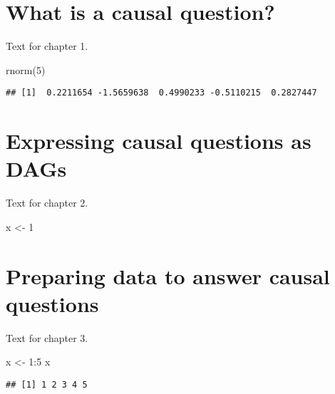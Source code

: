 \documentclass[
]{article}
\newenvironment{Shaded}{\begin{snugshade}}{\end{snugshade}}
\newcommand{\DecValTok}[1]{\textcolor[rgb]{0.00,0.00,0.81}{#1}}
\newcommand{\FunctionTok}[1]{\textcolor[rgb]{0.00,0.00,0.00}{#1}}
\newcommand{\NormalTok}[1]{#1}
\newcommand{\OtherTok}[1]{\textcolor[rgb]{0.56,0.35,0.01}{#1}}
\newcommand{\SpecialCharTok}[1]{\textcolor[rgb]{0.00,0.00,0.00}{#1}}
\begin{document}
\hypertarget{what-is-a-causal-question}{%
\section{What is a causal question?}\label{what-is-a-causal-question}}

Text for chapter 1.

\begin{Shaded}
\begin{Highlighting}[]
\FunctionTok{rnorm}\NormalTok{(}\DecValTok{5}\NormalTok{)}
\end{Highlighting}
\end{Shaded}

\begin{verbatim}
## [1]  0.2211654 -1.5659638  0.4990233 -0.5110215  0.2827447
\end{verbatim}

\hypertarget{expressing-causal-questions-as-dags}{%
\section{Expressing causal questions as DAGs}\label{expressing-causal-questions-as-dags}}

Text for chapter 2.

\begin{Shaded}
\begin{Highlighting}[]
\NormalTok{x }\OtherTok{\textless{}{-}} \DecValTok{1}
\end{Highlighting}
\end{Shaded}

\hypertarget{preparing-data-to-answer-causal-questions}{%
\section{Preparing data to answer causal questions}\label{preparing-data-to-answer-causal-questions}}

Text for chapter 3.

\begin{Shaded}
\begin{Highlighting}[]
\NormalTok{x }\OtherTok{\textless{}{-}} \DecValTok{1}\SpecialCharTok{:}\DecValTok{5}
\NormalTok{x}
\end{Highlighting}
\end{Shaded}

\begin{verbatim}
## [1] 1 2 3 4 5
\end{verbatim}
\end{document}

